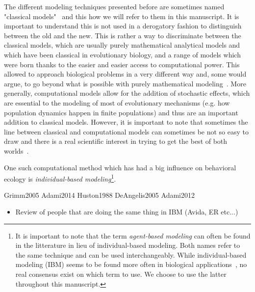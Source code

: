     The different modeling techniques presented before are sometimes named "classical models"~\cite{Huston1988, Adami2014} and this how we will refer to them in this manuscript. It is important to understand this is not used in a derogatory fashion to distinguish between the old and the new. This is rather a way to discriminate between the classical models, which are usually purely mathematical analytical models and which have been classical in evolutionary biology, and a range of models which were born thanks to the easier and easier access to computational power. This allowed to approach biological problems in a very different way and, some would argue, to go beyond what is possible with purely mathematical modeling~\cite{Adami2012}. More generally, computational models allow for the addition of stochastic effects, which are essential to the modeling of most of evolutionary mechanisms (e.g. how population dynamics happen in finite populations) and thus are an important addition to classical models. However, it is important to note that sometimes the line between classical and computational models can sometimes be not so easy to draw and there is a real scientific interest in trying to get the best of both worlds~\cite{Wilson1998}.

    One such computational method which has had a big influence on behavioral ecology is \emph{individual-based modeling}\footnote{It is important to note that the term \emph{agent-based modeling} can often be found in the litterature in lieu of individual-based modeling. Both names refer to the same technique and can be used interchangeably. While individual-based modeling (IBM) seems to be found more often in biological applications~\cite{Grimm2005}, no real consensus exist on which term to use. We choose to use the latter throughout this manuscript.}.

    Grimm2005
    Adami2014
    Huston1988
    DeAngelis2005
    Adami2012


    \begin{itemize}
      \item{Review of people that are doing the same thing in IBM (Avida, ER etc...)}
    \end{itemize}








































